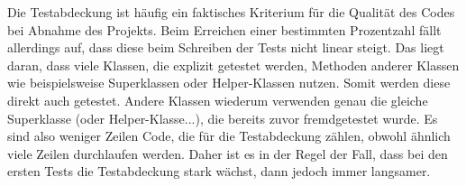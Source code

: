 	Die Testabdeckung ist häufig ein faktisches Kriterium für die Qualität des Codes bei Abnahme des Projekts. Beim Erreichen einer bestimmten Prozentzahl fällt allerdings auf, dass diese beim Schreiben der Tests nicht linear steigt. Das liegt daran, dass viele Klassen, die explizit getestet werden, Methoden anderer Klassen wie beispielsweise Superklassen oder Helper-Klassen nutzen. Somit werden diese direkt auch getestet. Andere Klassen wiederum verwenden genau die gleiche Superklasse (oder Helper-Klasse...), die bereits zuvor fremdgetestet wurde. Es sind also weniger Zeilen Code, die für die Testabdeckung zählen, obwohl ähnlich viele Zeilen durchlaufen werden. Daher ist es in der Regel der Fall, dass bei den ersten Tests die Testabdeckung stark wächst, dann jedoch immer langsamer.
	
	
	